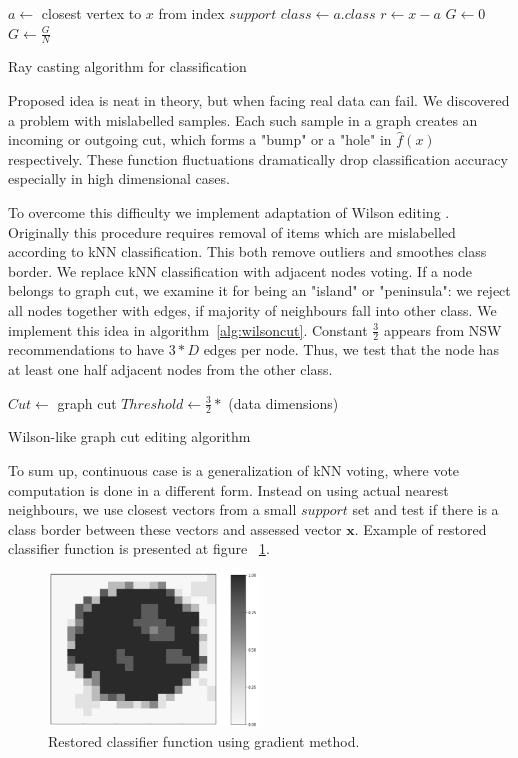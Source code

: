 \begin{algorithm}
\label{alg:integral}
\SetAlgoLined
{}
 $a \gets$ closest vertex to $x$ from index $support$\;
 $class \gets a.class$\;
 $r \gets x - a$\;
 $G \gets 0$\;
 $G \gets \frac{G}{N}$\;
 \;
 \caption{Ray casting algorithm for classification}
\end{algorithm}

Proposed idea is neat in theory, but when facing real data can fail. We discovered a problem with mislabelled samples. Each such sample in a graph creates an incoming or outgoing cut, which forms a "bump" or a "hole" in $\hat{f}(x)$ respectively. These function fluctuations dramatically drop classification accuracy especially in high dimensional cases.

To overcome this difficulty we implement adaptation of Wilson editing \cite{Wilson}. Originally this procedure requires removal of items which are mislabelled according to kNN classification. This both remove outliers and smoothes class border. We replace kNN classification with adjacent nodes voting. If a node belongs to graph cut, we examine it for being an "island" or "peninsula": we reject all nodes together with edges, if majority of neighbours fall into other class. We implement this idea in algorithm~\ref{alg:wilsoncut}. Constant $\frac{3}{2}$ appears from NSW recommendations to have $3*D$ edges per node. Thus, we test that the node has at least one half adjacent nodes from the other class.

\begin{algorithm}
\label{alg:wilsoncut}
\SetAlgoLined
 $Cut \gets$ graph cut\;
 $Threshold \gets \frac{3}{2}*$ (data dimensions)\;
 \caption{Wilson-like graph cut editing algorithm}
\end{algorithm}

To sum up, continuous case is a generalization of kNN voting, where vote computation is done in a different form. Instead on using actual nearest neighbours, we use closest vectors from a small $support$ set and test if there is a class border between these vectors and assessed vector $\textbf{x}$. Example of restored classifier function is presented at figure ~\ref{fig:clfimg}.

\begin{figure}
    \includegraphics[width=0.5\textwidth]{paper/images/03_clf_grad.png}
    \caption{Restored classifier function using gradient method.}
    \label{fig:clfimg}
\end{figure}